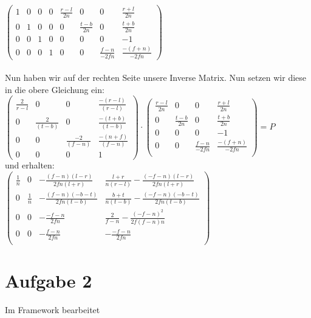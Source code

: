\documentclass[12pt]{article}
\begin{document}
$\left(
\begin{array}{cccc|cccc}
  1 &  0 &  0 & 0 & \frac{r-l}{2n} & 0 & 0 & \frac{r+l}{2n} \\
  0 &  1 &  0 & 0 & 0 & \frac{t-b}{2n} & 0 & \frac{t+b}{2n} \\
  0 & 0 & 1 & 0 & 0 & 0 & 0 & -1\\
  0 & 0 & 0 & 1 & 0 & 0 & \frac{f-n}{-2fn} & \frac{-(f+n)}{-2fn}
\end{array}
\right)$\\
\\
Nun haben wir auf der rechten Seite unsere Inverse Matrix. Nun setzen wir diese in die obere Gleichung ein:\\
$\left(
\begin{array}{cccc}
\frac{2}{r-l} & 0 & 0 & \frac{-(r-l)}{(r-l)} \\
0 & \frac{2}{(t-b)} & 0 & \frac{-(t+b)}{(t-b)} \\
0 & 0 & \frac{-2}{(f-n)} &  \frac{-(n+f)}{(f-n)} \\
0 & 0 & 0 & 1
\end{array}
\right) \cdot \left(
\begin{array}{cccc}
\frac{r-l}{2n} & 0 & 0 & \frac{r+l}{2n} \\
 0 & \frac{t-b}{2n} & 0 & \frac{t+b}{2n} \\
0 & 0 & 0 & -1 \\
 0 & 0 & \frac{f-n}{-2fn} & \frac{-(f+n)}{-2fn} \\
\end{array}
\right) = P$\\
und erhalten:\\
$ \left(
\begin{array}{cccc}
\frac{1}{n}& 0 & -\frac{(f-n)(l-r)}{2fn(l+r)} & \frac{l+r}{n(r-l)} - \frac{(-f-n)(l-r)}{2fn(l+r)}\\
 0 & \frac{1}{n} & -\frac{(f-n)(-b-t)}{2fn(t-b)} & \frac{b+t}{n(t-b)} - \frac{(-f-n)(-b-t)}{2fn(t-b)} \\
0 & 0 & -\frac{-f-n}{2fn} & \frac{2}{f-n} - \frac{(-f-n)^2}{2f(f-n)n} \\
0 & 0 & -\frac{f-n}{2fn} & -\frac{-f-n}{2fn} \\
\end{array}
\right)$
\section*{Aufgabe 2}
Im Framework bearbeitet
\end{document}
